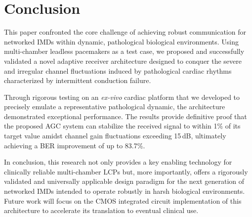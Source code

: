 \documentclass[journal]{IEEEtran}
\begin{document}
%
%

\section{Conclusion}
\label{sec:conclusion}

This paper confronted the core challenge of achieving robust communication for networked IMDs within dynamic, pathological biological environments. Using multi-chamber leadless pacemakers as a test case, we proposed and successfully validated a novel adaptive receiver architecture designed to conquer the severe and irregular channel fluctuations induced by pathological cardiac rhythms characterized by intermittent conduction failure.

Through rigorous testing on an \textit{ex-vivo} cardiac platform that we developed to precisely emulate a representative pathological dynamic, the architecture demonstrated exceptional performance. The results provide definitive proof that the proposed AGC system can stabilize the received signal to within 1\% of its target value amidst channel gain fluctuations exceeding 15\,dB, ultimately achieving a BER improvement of up to 83.7\%.

In conclusion, this research not only provides a key enabling technology for clinically reliable multi-chamber LCPs but, more importantly, offers a rigorously validated and universally applicable design paradigm for the next generation of networked IMDs intended to operate robustly in harsh biological environments. Future work will focus on the CMOS integrated circuit implementation of this architecture to accelerate its translation to eventual clinical use.



\end{document}
